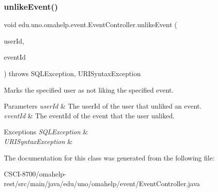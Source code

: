 \subsubsection{\texorpdfstring{unlike\+Event()}{unlikeEvent()}}
{\footnotesize\ttfamily void edu.\+uno.\+omahelp.\+event.\+Event\+Controller.\+unlike\+Event (\begin{DoxyParamCaption}\item[{@Request\+Param int}]{user\+Id,  }\item[{@Request\+Param int}]{event\+Id }\end{DoxyParamCaption}) throws S\+Q\+L\+Exception, U\+R\+I\+Syntax\+Exception}

Marks the specified user as not liking the specified event.


\begin{DoxyParams}{Parameters}
{\em user\+Id} & The user\+Id of the user that unliked an event. \\
\hline
{\em event\+Id} & The event\+Id of the event that the user unliked. \\
\hline
\end{DoxyParams}

\begin{DoxyExceptions}{Exceptions}
{\em S\+Q\+L\+Exception} & \\
\hline
{\em U\+R\+I\+Syntax\+Exception} & \\
\hline
\end{DoxyExceptions}


The documentation for this class was generated from the following file\+:\begin{DoxyCompactItemize}
\item 
C\+S\+C\+I-\/8700/omahelp-\/rest/src/main/java/edu/uno/omahelp/event/Event\+Controller.\+java\end{DoxyCompactItemize}
